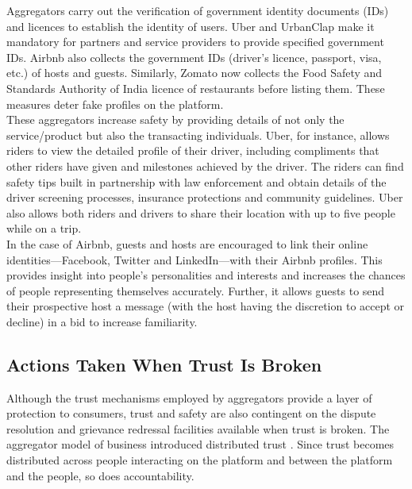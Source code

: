 \documentclass[a4paper, 12pt]{article}
\begin{document}
Aggregators carry out the verification of government identity documents (IDs) and licences to establish the identity of users. Uber and UrbanClap make it mandatory for partners and service providers to provide specified government IDs. Airbnb also collects the government IDs (driver’s licence, passport, visa, etc.) of hosts and guests. Similarly, Zomato now collects the Food Safety and Standards Authority of India licence of restaurants before listing them. These measures deter fake profiles on the platform.\\

These aggregators increase safety by providing details of not only the service/product but also the transacting individuals. Uber, for instance, allows riders to view the detailed profile of their driver, including compliments that other riders have given and milestones achieved by the driver. The riders can find safety tips built in partnership with law enforcement and obtain details of the driver screening processes, insurance protections and community guidelines. Uber also allows both riders and drivers to share their location with up to five people while on a trip. \\

In the case of Airbnb, guests and hosts are encouraged to link their online identities—Facebook, Twitter and LinkedIn—with their Airbnb profiles. This provides insight into people’s personalities and interests and increases the chances of people representing themselves accurately. Further, it allows guests to send their prospective host a message (with the host having the discretion to accept or decline) in a bid to increase familiarity. 

               
                    
                    \subsection{Actions Taken When Trust Is Broken}
                    
                    Although the trust mechanisms employed by aggregators provide a layer of protection to consumers, trust and safety are also contingent on the dispute resolution and grievance redressal facilities available when trust is broken. The aggregator model of business introduced distributed trust \parencite{BotsmanR}. Since trust becomes distributed across people interacting on the platform and between the platform and the people, so does accountability.\\
\end{document}
